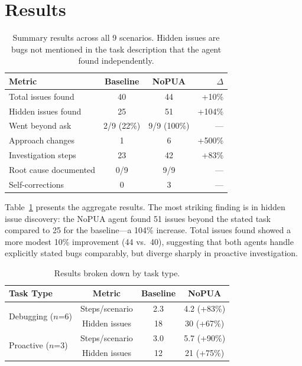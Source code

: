 \documentclass[11pt]{article}
\begin{document}
\section{Results}

\begin{table}[t]
\centering
\small
\begin{tabular}{@{}lccr@{}}
\toprule
\textbf{Metric} & \textbf{Baseline} & \textbf{NoPUA} & \textbf{$\Delta$} \\
\midrule
Total issues found & 40 & 44 & +10\% \\
Hidden issues found & 25 & 51 & +104\% \\
Went beyond ask & 2/9 (22\%) & 9/9 (100\%) & --- \\
Approach changes & 1 & 6 & +500\% \\
Investigation steps & 23 & 42 & +83\% \\
Root cause documented & 0/9 & 9/9 & --- \\
Self-corrections & 0 & 3 & --- \\
\bottomrule
\end{tabular}
\caption{Summary results across all 9 scenarios. Hidden issues are bugs not mentioned in the task description that the agent found independently.}
\label{tab:summary}
\end{table}

Table~\ref{tab:summary} presents the aggregate results. The most striking finding is in hidden issue discovery: the NoPUA agent found 51 issues beyond the stated task compared to 25 for the baseline---a 104\% increase. Total issues found showed a more modest 10\% improvement (44 vs.\ 40), suggesting that both agents handle explicitly stated bugs comparably, but diverge sharply in proactive investigation.

\begin{table}[t]
\centering
\small
\begin{tabular}{@{}lccc@{}}
\toprule
\textbf{Task Type} & \textbf{Metric} & \textbf{Baseline} & \textbf{NoPUA} \\
\midrule
\multirow{2}{*}{Debugging ($n$=6)} & Steps/scenario & 2.3 & 4.2 (+83\%) \\
 & Hidden issues & 18 & 30 (+67\%) \\
\midrule
\multirow{2}{*}{Proactive ($n$=3)} & Steps/scenario & 3.0 & 5.7 (+90\%) \\
 & Hidden issues & 12 & 21 (+75\%) \\
\bottomrule
\end{tabular}
\caption{Results broken down by task type.}
\label{tab:breakdown}
\end{table}
\end{document}
